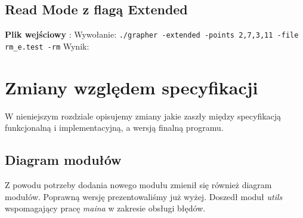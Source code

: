 \documentclass[10pt, a4paper]{report}
\begin{document}
    \subsection{Read Mode z flagą Extended}
    \textbf{Plik wejściowy} :
    \newline Wywołanie:
    \newline\newline \texttt{./grapher -extended -points 2,7,3,11 -file rm\_e.test -rm}
    \newline\newline Wynik:

    \section{Zmiany względem specyfikacji}
    W nieniejszym rozdziale opisujemy zmiany jakie zaszły między specyfikacją funkcjonalną i implementacyjną, a wersją finalną programu.

    \subsection{Diagram modułów}
    Z powodu potrzeby dodania nowego modułu zmienił się również diagram modułów. Poprawną wersję prezentowaliśmy już wyżej.
    Doszedł moduł \textit{utils} wspomagający pracę \textit{maina} w zakresie obsługi błędów.
\end{document}

